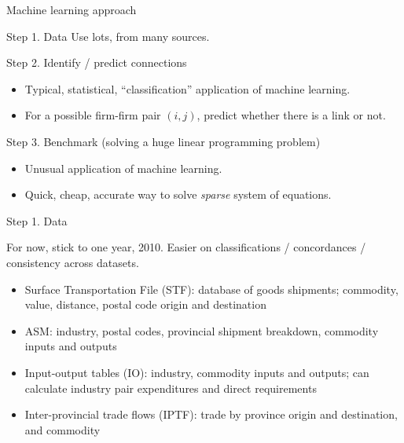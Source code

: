 \documentclass[12pt]{beamer}
\begin{document}
\begin{frame}{Machine learning approach}

\begin{block}{Step 1. Data}
Use lots, from many sources.
\end{block}

\begin{block}{Step 2. Identify / predict connections}
\begin{itemize}
\item Typical, statistical, ``classification'' application of machine learning. 
\item For a possible firm-firm pair $(i,j)$, predict whether there is a link or not. 
\end{itemize}
\end{block}

\begin{block}{Step 3. Benchmark (solving a huge linear programming problem)}
\begin{itemize}
\item Unusual application of machine learning.
\item Quick, cheap, accurate way to solve \emph{sparse} system of equations.
\end{itemize}
\end{block}

\end{frame}


\begin{frame}{Step 1. Data}

For now, stick to one year, 2010. Easier on classifications / concordances / consistency across datasets. 

\begin{itemize}
\item Surface Transportation File (STF): database of goods shipments; commodity, value, distance, postal code origin and destination
\item ASM: industry, postal codes, provincial shipment breakdown, commodity inputs and outputs
\item Input-output tables (IO): industry, commodity inputs and outputs; can calculate industry pair expenditures and direct requirements
\item Inter-provincial trade flows (IPTF): trade by province origin and destination, and commodity
\end{itemize}

% 

\end{frame}
\end{document}
